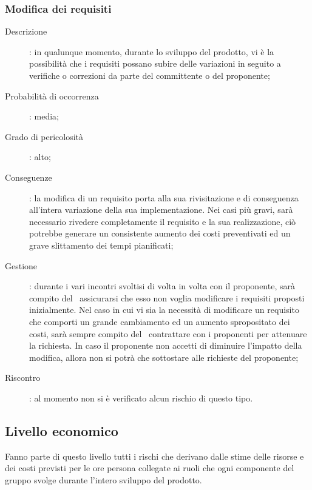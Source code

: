 \documentclass[../PianoDiProgetto.tex]{subfiles}
\begin{document}
		\subsubsection{Modifica dei requisiti}
		\begin{description}
			\item [Descrizione]: in qualunque momento, durante lo sviluppo del prodotto, vi è la possibilità che i requisiti possano subire delle variazioni in seguito a verifiche o correzioni da parte del committente o del proponente;
			\item [Probabilità di occorrenza]: media;
			\item [Grado di pericolosità]: alto;
			\item [Conseguenze]: la modifica di un requisito porta alla sua rivisitazione e di conseguenza all'intera variazione della sua implementazione. Nei casi più gravi, sarà necessario rivedere completamente il requisito e la sua realizzazione, ciò potrebbe generare un consistente aumento dei costi preventivati ed un grave slittamento dei tempi pianificati;
			\item [Gestione]: durante i vari incontri svoltisi di volta in volta con il proponente, sarà compito del \responsabilediprogetto\ assicurarsi che esso non voglia modificare i requisiti proposti inizialmente. Nel caso in cui vi sia la necessità di modificare un requisito che comporti un grande cambiamento ed un aumento spropositato dei costi, sarà sempre compito del \responsabilediprogetto\ contrattare con i proponenti per attenuare la richiesta. In caso il proponente non accetti di diminuire l’impatto della modifica, allora non si potrà che sottostare alle richieste del proponente;
			\item [Riscontro]: al momento non si è verificato alcun rischio di questo tipo.
		\end{description}

	\subsection{Livello economico}
	Fanno parte di questo livello tutti i rischi che derivano dalle stime delle risorse e dei costi previsti per le ore persona collegate ai ruoli che ogni componente del gruppo svolge durante l'intero sviluppo del prodotto.	
\end{document}
